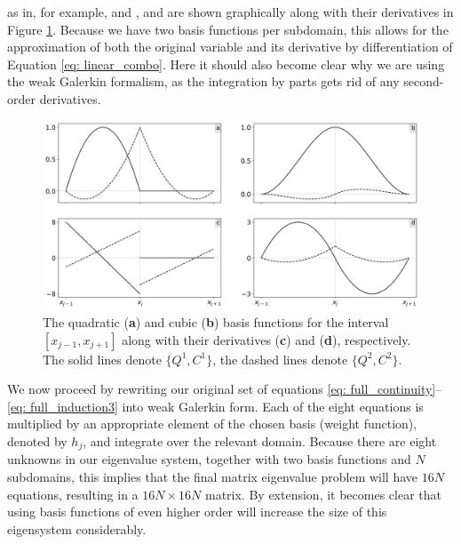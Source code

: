 \endgroup
as in, for example, \citet{kerner1998} and \citet{book_MHD}, and are shown graphically along with their derivatives in Figure \ref{fig: basisfunctions}. Because we have two basis functions per subdomain, this allows for the approximation of both the original variable and its derivative by differentiation of Equation \eqref{eq: linear_combo}. Here it should also become clear why we are using the weak Galerkin formalism, as the integration by parts gets rid of any second-order derivatives.

\begin{figure}[t]
  \centering
  \includegraphics[width=\textwidth]{basisfunctions.png}
  \caption{
    The quadratic (\textbf{a}) and cubic (\textbf{b}) basis functions for the interval $[x_{j-1}, x_{j+1}]$ along with their derivatives (\textbf{c}) and (\textbf{d}), respectively. The solid lines denote $\{Q^1, C^1\}$, the dashed lines denote $\{Q^2, C^2\}$.
  }
  \label{fig: basisfunctions}
\end{figure}

We now proceed by rewriting our original set of equations \eqref{eq: full_continuity}--\eqref{eq: full_induction3} into weak Galerkin form. Each of the eight equations is multiplied by an appropriate element of the chosen basis (weight function), denoted by $h_j$, and integrate over the relevant domain. Because there are eight unknowns in our eigenvalue system, together with two basis functions and $N$ subdomains, this implies that the final matrix eigenvalue problem will have $16 N$ equations, resulting in a $16N \times 16N$ matrix. By extension, it becomes clear that using basis functions of even higher order will increase the size of this eigensystem considerably.

